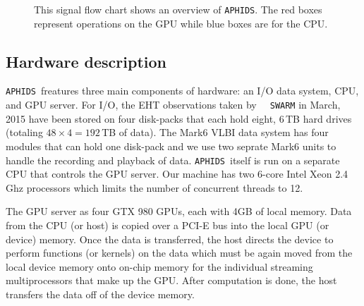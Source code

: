 \documentclass[11pt,preprint]{aastex}
\newcommand{\SWARM}[1]{\texttt{#1\,SWARM}}
\newcommand{\APHIDS}{\texttt{APHIDS}}
\begin{document}
\begin{figure}[H]
\begin{center}
\label{fig:aphids_flow_chart}
\caption{This signal flow chart shows an overview of \APHIDS.  The red boxes represent operations on the GPU while blue boxes are for the CPU.}
\end{center}
\end{figure}

\subsection{Hardware description}

\APHIDS\, freatures three main components of hardware: an I/O data system, CPU, and GPU server.  For I/O, the 
EHT observations taken by \SWARM\, in March, 2015 have been stored on four disk-packs that each hold eight, 
6\,TB hard drives (totaling $48 \times 4 = 192$\,TB of data).  The Mark6 VLBI data system has four modules that can hold one disk-pack and we use
two seprate Mark6 units to handle the recording and playback of data.  \APHIDS\, itself is run on a separate CPU 
that controls the GPU server.  Our machine has two 6-core Intel Xeon 2.4 Ghz 
processors which limits the number of concurrent threads to 12.

The GPU server as four GTX 980 GPUs, each with 4GB of local memory.  Data from the CPU (or host) is copied over 
a PCI-E bus into the local GPU (or device) memory.  Once the data is transferred, the host directs the device
to perform functions (or kernels) on the data which must be again moved from the local device memory onto 
on-chip memory for the individual streaming multiprocessors that make up the GPU.  After computation is done, 
the host transfers the data off of the device memory.
\end{document}
